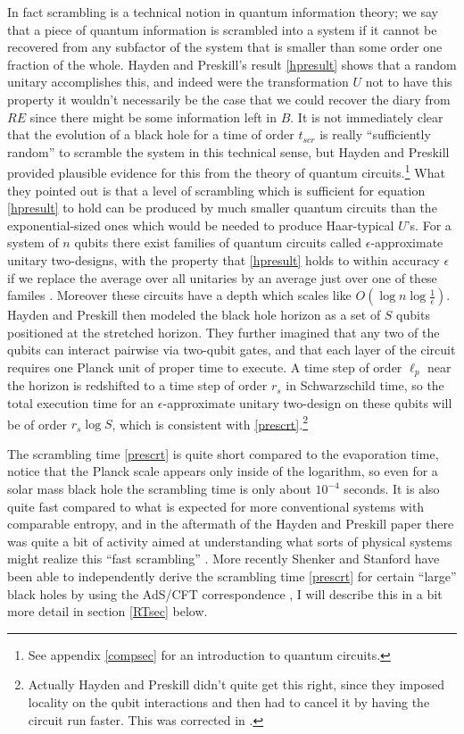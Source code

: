 \documentclass[12pt]{article}
\begin{document}
In fact scrambling is a technical notion in quantum information theory; we say that a piece of quantum information is scrambled into a system if it cannot be recovered from any subfactor of the system that is smaller than some order one fraction of the whole.  Hayden and Preskill's result \eqref{hpresult} shows that a random unitary accomplishes this, and indeed were the transformation $U$ not to have this property it wouldn't necessarily be the case that we could recover the diary from $RE$ since there might be some information left in $B$.  It is not immediately clear that the evolution of a black hole for a time of order $t_{\mathit{scr}}$ is really ``sufficiently random'' to scramble the system in this technical sense, but Hayden and Preskill provided plausible evidence for this from the theory of quantum circuits.\footnote{See appendix \ref{compsec} for an introduction to quantum circuits.}  What they pointed out is that a level of scrambling which is sufficient for equation \eqref{hpresult} to hold can be produced by much smaller quantum circuits than the exponential-sized ones which would be needed to produce Haar-typical $U$'s.  For a system of $n$ qubits there exist families of quantum circuits called $\epsilon$-approximate unitary two-designs, with the property that \eqref{hpresult} holds to within accuracy $\epsilon$ if we replace the average over all unitaries by an average just over one of these familes \cite{dankert2009exact}.  Moreover these circuits have a depth which scales like $O\left(\log n \log\frac{1}{\epsilon}\right)$. Hayden and Preskill then modeled the black hole horizon as a set of $S$ qubits positioned at the stretched horizon.  They further imagined that any two of the qubits can interact pairwise via two-qubit gates, and that each layer of the circuit requires one Planck unit of proper time to execute.  A time step of order $\ell_p$ near the horizon is redshifted to a time step of order $r_s$ in Schwarzschild time, so the total execution time for an $\epsilon$-approximate unitary two-design on these qubits will be of order $r_s\log S$, which is consistent with \eqref{prescrt}.\footnote{Actually Hayden and Preskill didn't quite get this right, since they imposed locality on the qubit interactions and then had to cancel it by having the circuit run faster.  This was corrected in \cite{Sekino:2008he}.}


The scrambling time \eqref{prescrt} is quite short compared to the evaporation time, notice that the Planck scale appears only inside of the logarithm, so even for a solar mass black hole the scrambling time is only about $10^{-4}$ seconds.  It is also quite fast compared to what is expected for more conventional systems with comparable entropy, and in the aftermath of the Hayden and Preskill paper there was quite a bit of activity aimed at understanding what sorts of physical systems might realize this ``fast scrambling'' \cite{Sekino:2008he,Lashkari:2011yi,Barbon:2011pn,Barbon:2012zv}.  More recently Shenker and Stanford have been able to independently derive the scrambling time \eqref{prescrt} for certain ``large'' black holes by using the AdS/CFT correspondence \cite{Shenker:2013pqa,Shenker:2013yza}, I will describe this in a bit more detail in section \ref{RTsec} below.
\end{document}
